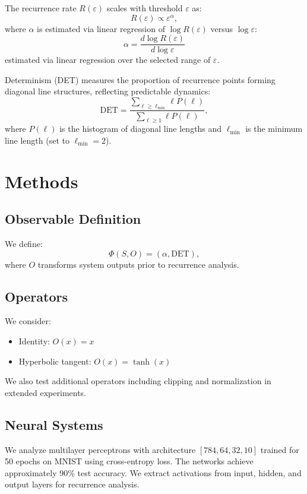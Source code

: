 \documentclass[11pt]{article}
\begin{document}
The recurrence rate $R(\varepsilon)$ scales with threshold $\varepsilon$ as:
\[
	R(\varepsilon) \propto \varepsilon^\alpha,
\]
where $\alpha$ is estimated via linear regression of $\log R(\varepsilon)$ versus $\log \varepsilon$:
\[
	\alpha = \frac{d \log R(\varepsilon)}{d \log \varepsilon}
\]
estimated via linear regression over the selected range of $\varepsilon$.

Determinism (DET) measures the proportion of recurrence points forming diagonal line structures, reflecting predictable dynamics:
\[
	\mathrm{DET} = \frac{\sum_{\ell \geq \ell_{\min}} \ell P(\ell)}{\sum_{\ell \geq 1} \ell P(\ell)},
\]
where $P(\ell)$ is the histogram of diagonal line lengths and $\ell_{\min}$ is the minimum line length (set to $\ell_{\min} = 2$).

\section{Methods}

\subsection{Observable Definition}

We define:
\[
	\Phi(S, O) = (\alpha, \mathrm{DET}),
\]
where $O$ transforms system outputs prior to recurrence analysis.

\subsection{Operators}

We consider:
\begin{itemize}
	\item Identity: $O(x) = x$
	\item Hyperbolic tangent: $O(x) = \tanh(x)$
\end{itemize}

We also test additional operators including clipping and normalization in extended experiments.

\subsection{Neural Systems}

We analyze multilayer perceptrons with architecture $[784, 64, 32, 10]$ trained for 50 epochs on MNIST using cross-entropy loss. The networks achieve approximately 90\% test accuracy. We extract activations from input, hidden, and output layers for recurrence analysis.
\end{document}
